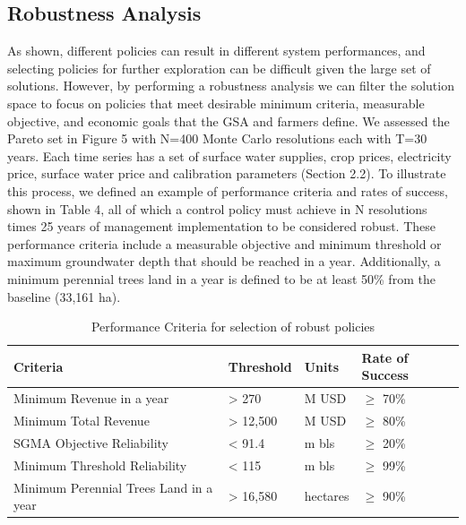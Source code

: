 \documentclass[a4paper,fleqn]{cas-sc}
\begin{document}
\subsection{Robustness Analysis}

As shown, different policies can result in different system performances, and selecting policies for further exploration can be difficult given the large set of solutions. However, by performing a robustness analysis we can filter the solution space to focus on policies that meet desirable minimum criteria, measurable objective, and economic goals that the GSA and farmers define. We assessed the Pareto set in Figure 5 with N=400 Monte Carlo resolutions each with T=30 years. Each time series has a set of surface water supplies, crop prices, electricity price, surface water price and calibration parameters (Section 2.2). To illustrate this process, we defined an example of performance criteria and rates of success, shown in Table 4, all of which a control policy must achieve in N resolutions times 25 years of management implementation to be considered robust. These performance criteria include a measurable objective and minimum threshold or maximum groundwater depth that should be reached in a year. Additionally, a minimum perennial trees land in a year is defined to be at least 50\% from the baseline (33,161 ha). 

\begin{table}[width=.9\linewidth,cols=4,pos=h]
\caption{Performance Criteria for selection of robust policies}
\begin{tabular*}{\linewidth}{@{} LLLL@{}}
\toprule
 Criteria  & Threshold & Units & Rate of Success \\ 
\midrule
Minimum Revenue in a year  & > 270 & M USD & $\geq$ 70\% \\
Minimum Total Revenue   & > 12,500 & M USD & $\geq$ 80\% \\
SGMA Objective Reliability & < 91.4 & m bls & $\geq$ 20\%  \\
Minimum Threshold Reliability  & < 115 & m bls & $\geq$ 99\%  \\
Minimum Perennial Trees Land in a year  & > 16,580 & hectares & $\geq$ 90\%  \\
\bottomrule
\end{tabular*}
\end{table}
\end{document}
